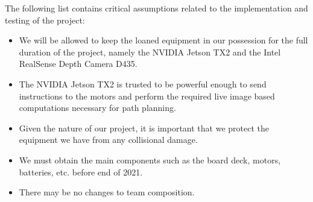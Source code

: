 The following list contains critical assumptions related to the implementation and testing of the project:

\begin{itemize}
  \item We will be allowed to keep the loaned equipment in our possession for the full duration of the project, namely the NVIDIA Jetson TX2 and the Intel RealSense Depth Camera D435.
  \item The NVIDIA Jetson TX2 is trusted to be powerful enough to send instructions to the motors and perform the required live image based computations necessary for path planning. 
  \item Given the nature of our project, it is important that we protect the equipment we have from any collisional damage. 
  \item We must obtain the main components such as the board deck, motors, batteries, etc. before end of 2021. 
  \item There may be no changes to team composition. 
\end{itemize}